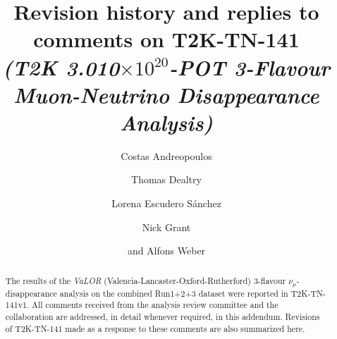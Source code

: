 %
%

\begin{frontmatter}

\title{
  Revision history and replies to comments on T2K-TN-141\\
  {\em(T2K 3.010$\times10^{20}$-POT 3-Flavour Muon-Neutrino Disappearance Analysis)}
}

\vspace*{0.7cm}

\author[RAL]     {Costas Andreopoulos}
\author[RAL,OXF] {Thomas Dealtry}
\author[IFIC]    {Lorena Escudero S\'anchez}
\author[LANCS]   {Nick Grant}
\author[RAL,OXF] {and Alfons Weber}

\address[RAL]{Particle Physics Dept., Rutherford Appleton Laboratory, STFC \\
              Harwell Oxford Campus\\
              Oxfordshire OX11 0QX, UK}

\address[OXF]{Subdepartment of Particle Physics, University of Oxford \\
              Denys Wilkinson Building, Keble Road\\
              Oxfordshire OX1 3RH, UK}

\address[IFIC]{Instituto de Fisica Corpuscular\\
              CSIC and University of Valencia\\
              Valencia, Spain}

\address[LANCS]{Physics Dept., Lancaster University \\
              Lancaster, LA1 4YB, UK}

%
%

\begin{abstract}

The results of the {\em VaLOR} (Valencia-Lancaster-Oxford-Rutherford) 
3-flavour $\nu_{\mu}$-disappearance analysis on the combined Run1+2+3 dataset 
were reported in T2K-TN-141v1.
All comments received from the analysis review committee and the collaboration
are addressed, in detail whenever required, in this addendum.
Revisions of T2K-TN-141 made as a response to these comments 
are also summarized here.

\end{abstract}

\end{frontmatter}


\tableofcontents

\clearpage



